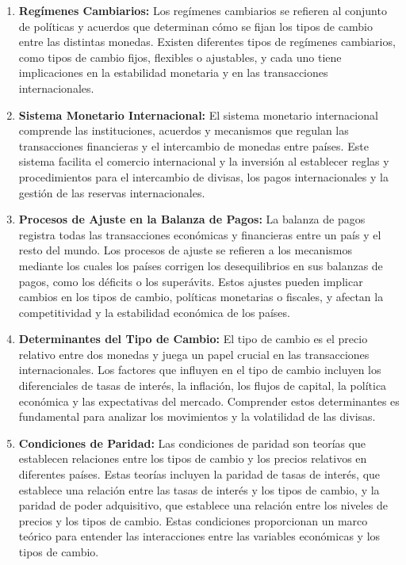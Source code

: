 \documentclass[
  a4paper,
]{article}
\begin{document}
\begin{enumerate}
\def\labelenumi{\arabic{enumi}.}
\item
  \textbf{Regímenes Cambiarios:} Los regímenes cambiarios se refieren al
  conjunto de políticas y acuerdos que determinan cómo se fijan los
  tipos de cambio entre las distintas monedas. Existen diferentes tipos
  de regímenes cambiarios, como tipos de cambio fijos, flexibles o
  ajustables, y cada uno tiene implicaciones en la estabilidad monetaria
  y en las transacciones internacionales.
\item
  \textbf{Sistema Monetario Internacional:} El sistema monetario
  internacional comprende las instituciones, acuerdos y mecanismos que
  regulan las transacciones financieras y el intercambio de monedas
  entre países. Este sistema facilita el comercio internacional y la
  inversión al establecer reglas y procedimientos para el intercambio de
  divisas, los pagos internacionales y la gestión de las reservas
  internacionales.
\item
  \textbf{Procesos de Ajuste en la Balanza de Pagos:} La balanza de
  pagos registra todas las transacciones económicas y financieras entre
  un país y el resto del mundo. Los procesos de ajuste se refieren a los
  mecanismos mediante los cuales los países corrigen los desequilibrios
  en sus balanzas de pagos, como los déficits o los superávits. Estos
  ajustes pueden implicar cambios en los tipos de cambio, políticas
  monetarias o fiscales, y afectan la competitividad y la estabilidad
  económica de los países.
\item
  \textbf{Determinantes del Tipo de Cambio:} El tipo de cambio es el
  precio relativo entre dos monedas y juega un papel crucial en las
  transacciones internacionales. Los factores que influyen en el tipo de
  cambio incluyen los diferenciales de tasas de interés, la inflación,
  los flujos de capital, la política económica y las expectativas del
  mercado. Comprender estos determinantes es fundamental para analizar
  los movimientos y la volatilidad de las divisas.
\item
  \textbf{Condiciones de Paridad:} Las condiciones de paridad son
  teorías que establecen relaciones entre los tipos de cambio y los
  precios relativos en diferentes países. Estas teorías incluyen la
  paridad de tasas de interés, que establece una relación entre las
  tasas de interés y los tipos de cambio, y la paridad de poder
  adquisitivo, que establece una relación entre los niveles de precios y
  los tipos de cambio. Estas condiciones proporcionan un marco teórico
  para entender las interacciones entre las variables económicas y los
  tipos de cambio.
\end{enumerate}
\end{document}
